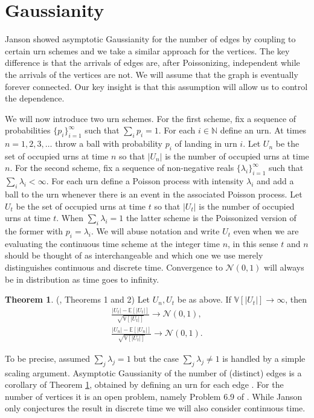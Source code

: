 \documentclass[12pt]{article}
\theoremstyle{definition}
\newtheorem{theorem}[proposition]{Theorem}
\begin{document}
\section{Gaussianity} \label{Gaussianity}
Janson \cite{janson_2017_on} showed asymptotic Gaussianity for the number of edges by coupling to certain urn schemes and we take a similar approach for the vertices. The key difference is that the arrivals of edges are, after Poissonizing, independent while the arrivals of the vertices are not. We will assume that the graph is eventually forever connected. Our key insight is that this assumption will allow us to control the dependence.

We will now introduce two urn schemes. For the first scheme, fix a sequence of probabilities $\{p_i\}_{i=1}^\infty$ such that $\sum_i p_i = 1$. For each $i \in \mathbb{N}$ define an urn. At times $n=1,2,3,\ldots$ throw a ball with probability $p_i$ of landing in urn $i$. Let $U_n$ be the set of occupied urns at time $n$ so that $|U_n|$ is the number of occupied urns at time $n$. For the second scheme, fix a sequence of non-negative reals $\{\lambda_i\}_{i=1}^\infty$ such that $\sum_i \lambda_i < \infty$. For each urn define a Poisson process with intensity $\lambda_i$ and add a ball to the urn whenever there is an event in the associated Poisson process. Let $U_t$ be the set of occupied urns at time $t$ so that $|U_t|$ is the number of occupied urns at time $t$. When $\sum_i \lambda_i = 1$ the latter scheme is the Poissonized version of the former with $p_i = \lambda_i$. We will abuse notation and write $U_t$ even when we are evaluating the continuous time scheme at the integer time $n$, in this sense $t$ and $n$ should be thought of as interchangeable and which one we use merely distinguishes continuous and discrete time. Convergence to $\mathcal{N}(0,1)$ will always be in distribution as time goes to infinity.

\begin{theorem} (\cite{dutko_1989_central}, Theorems 1 and 2) \label{Urn Gauss}
    Let $U_n, U_t$ be as above. If $\mathbb{V}[|U_t|] \rightarrow \infty$, then
    \begin{align*}
        \frac{|U_t|-\mathbb{E}[|U_t|]}{\sqrt{\mathbb{V}[|U_t|]}} \rightarrow \mathcal{N}(0,1), \\
        \frac{|U_n|-\mathbb{E}[|U_n|]}{\sqrt{\mathbb{V}[|U_t|]}} \rightarrow \mathcal{N}(0,1).
    \end{align*}
\end{theorem}
To be precise, \cite{dutko_1989_central} assumed $\sum_j \lambda_j =1$ but the case $\sum_j \lambda_j \neq 1$ is handled by a simple scaling argument. Asymptotic Gaussianity of the number of (distinct) edges is a corollary of Theorem \ref{Urn Gauss}, obtained by defining an urn for each edge \cite{janson_2017_on}. For the number of vertices it is an open problem, namely Problem 6.9 of \cite{janson_2017_on}. While Janson only conjectures the result in discrete time we will also consider continuous time.
\end{document}
